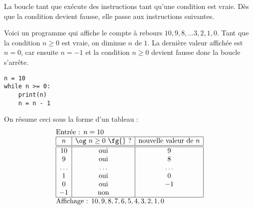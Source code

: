 \documentclass[11pt,class=report,crop=false]{standalone}
\begin{document}
\begin{cours}
La boucle \og{}tant que\fg{} exécute des instructions tant qu'une condition est vraie.
Dès que la condition devient fausse, elle passe aux instructions suivantes.




\begin{exemple}
\begin{minipage}{0.55\textwidth}
Voici un programme qui affiche le compte à rebours $10,9,8,\ldots3,2,1,0$.
Tant que la condition $n \ge 0$ est vraie, on diminue $n$ de $1$. La dernière valeur affichée est $n=0$, car ensuite $n=-1$ et la condition \og{}$n \ge 0$\fg{} devient fausse donc la boucle s'arrête.
\end{minipage}\qquad\qquad
\begin{minipage}{0.4\textwidth}
\begin{lstlisting}
n = 10
while n >= 0:
    print(n)
    n = n - 1
\end{lstlisting}
\end{minipage}

\medskip

On résume ceci sous la forme d'un tableau :
  $$
  \begin{array}{l}
  \text{Entrée : $n=10$}    \\
  \begin{array}{|c|c|c|}
  \hline  
  n & \text{\og $n\ge0$ \fg{} ?} & \text{nouvelle valeur de } n \\
  \hline\hline 
  10 & \text{oui} & 9 \\
  9 & \text{oui} & 8 \\
  \ldots & \ldots & \ldots \\
  1 & \text{oui} & 0 \\
  0 & \text{oui} & -1 \\
  -1 & \text{non} &  \\ 
  \hline
  \end{array} \\
  \text{Affichage : $10,9,8,7,6,5,4,3,2,1,0$}  
  \end{array} 
  $$ 


\end{exemple}
\end{cours}
\end{document}
